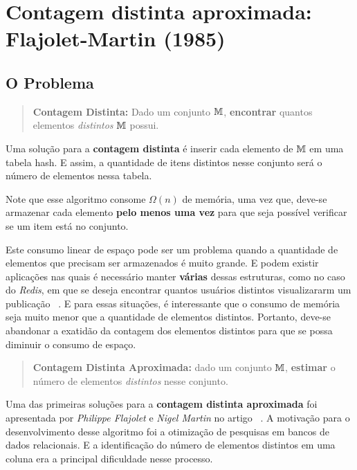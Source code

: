 \newcommand{\bitmap}{\text{BITMAP}}
\newcommand{\pcounting}{\textit{probabilistic counting}}

\chapter{Contagem distinta aproximada: Flajolet-Martin (1985)}
\label{lab:flajolet-martin}

\section{O Problema}

\begin{quote}
  \textbf{Contagem Distinta:} Dado um conjunto $\mathbb{M}$, \textbf{encontrar} quantos elementos \textit{distintos}
  $\mathbb{M}$ possui.
\end{quote}

Uma solução para a \textbf{contagem distinta} é inserir cada elemento de $\mathbb{M}$ em uma tabela hash. 
E assim, a quantidade de itens distintos nesse conjunto será o número de elementos nessa tabela.

Note que esse algoritmo consome $\Omega(n)$ de memória, uma vez que, deve-se armazenar cada elemento 
\textbf{pelo menos uma vez} para que seja possível verificar se um item está no conjunto.

Este consumo linear de espaço pode ser um problema quando a quantidade de elementos que precisam ser armazenados é muito 
grande. E podem existir aplicações nas quais é necessário manter \textbf{várias} dessas estruturas, como no caso do 
\textit{Redis}, em que se deseja encontrar quantos usuários distintos visualizararm um publicação ~\citep{Redis}. E para 
essas situações, é interessante que o consumo de memória seja muito menor que a quantidade de elementos distintos. 
Portanto, deve-se abandonar a exatidão da contagem dos elementos distintos para que se possa diminuir o consumo de 
espaço.

\begin{quote}
  \textbf{Contagem Distinta Aproximada:} dado um conjunto $\mathbb{M}$, \textbf{estimar} o número de elementos 
  \textit{distintos} nesse conjunto.
\end{quote}

Uma das primeiras soluções para a \textbf{contagem distinta aproximada} foi apresentada por \textit{Philippe Flajolet} e 
\textit{Nigel Martin} no artigo ~\citep{flajolet:martin:85}.
A motivação para o desenvolvimento desse algoritmo foi a otimização de pesquisas em bancos de dados relacionais.
E a identificação do número de elementos distintos em uma coluna era a principal dificuldade nesse processo.

